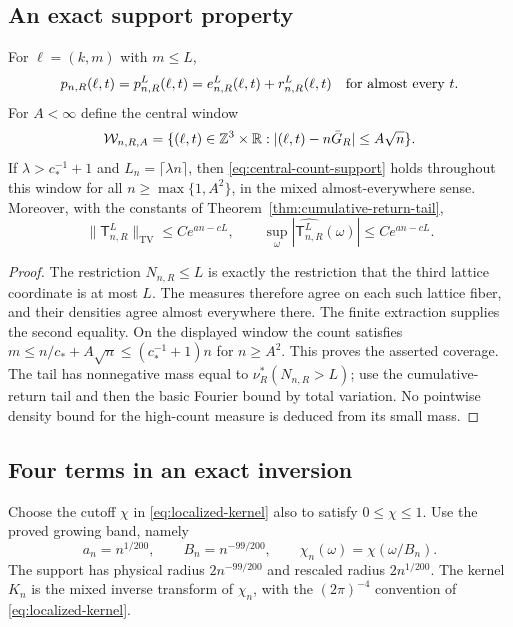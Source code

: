 \subsection{An exact support property}
\begin{lemma}
\label{lem:central-count-support}
For $\ell=(k,m)$ with $m\le L$,
\begin{equation}\label{eq:central-count-support}
 p_{n,R}(\ell,t)=p^L_{n,R}(\ell,t)
               =e^L_{n,R}(\ell,t)+r^L_{n,R}(\ell,t)
 \quad\hbox{for almost every }t.
\end{equation}
For $A<\infty$ define the central window
\[
 \mathcal W_{n,R,A}=
 \{(\ell,t)\in\mathbb Z^3\times\mathbb R:
                  |(\ell,t)-n\bar G_R|\le A\sqrt n\}.
\]
If $\lambda>c_*^{-1}+1$ and $L_n=\lceil\lambda n\rceil$, then
\eqref{eq:central-count-support} holds throughout this window for all
$n\ge\max\{1,A^2\}$, in the mixed almost-everywhere sense.
Moreover, with the constants of
Theorem~\ref{thm:cumulative-return-tail},
\begin{equation}\label{eq:count-tail-for-inversion}
 \|\mathsf T^{L}_{n,R}\|_{\mathrm{TV}}
           \le C e^{an-cL},\qquad
 \sup_\omega|\widehat{\mathsf T^{L}_{n,R}}(\omega)|
           \le C e^{an-cL}.
\end{equation}
\end{lemma}
\begin{proof}
The restriction $N_{n,R}\le L$ is exactly the restriction that the
third lattice coordinate is at most $L$. The measures therefore agree
on each such lattice fiber, and their densities agree almost everywhere
there. The finite extraction supplies the second equality.
On the displayed window the count satisfies
$m\le n/c_*+A\sqrt n\le (c_*^{-1}+1)n$ for $n\ge A^2$.
This proves the asserted coverage. The tail has nonnegative mass equal
to $\nu_R^*(N_{n,R}>L)$; use the cumulative-return tail and then the
basic Fourier bound by total variation. No pointwise density bound for
the high-count measure is deduced from its small mass.
\end{proof}

\subsection{Four terms in an exact inversion}
Choose the cutoff $\chi$ in \eqref{eq:localized-kernel} also to satisfy
$0\le\chi\le1$. Use the proved growing band, namely
\[
 a_n=n^{1/200},\qquad B_n=n^{-99/200},\qquad
 \chi_n(\omega)=\chi(\omega/B_n).
\]
The support has physical radius $2n^{-99/200}$ and rescaled radius
$2n^{1/200}$. The kernel $K_n$ is the mixed inverse transform of
$\chi_n$, with the $(2\pi)^{-4}$ convention of
\eqref{eq:localized-kernel}.

